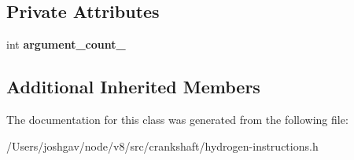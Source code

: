 \subsection*{Private Attributes}
\begin{DoxyCompactItemize}
\item 
int {\bfseries argument\+\_\+count\+\_\+}\hypertarget{classv8_1_1internal_1_1_h_call_a5c6c2d02f847f353780b327c663f3047}{}\label{classv8_1_1internal_1_1_h_call_a5c6c2d02f847f353780b327c663f3047}

\end{DoxyCompactItemize}
\subsection*{Additional Inherited Members}


The documentation for this class was generated from the following file\+:\begin{DoxyCompactItemize}
\item 
/\+Users/joshgav/node/v8/src/crankshaft/hydrogen-\/instructions.\+h\end{DoxyCompactItemize}
